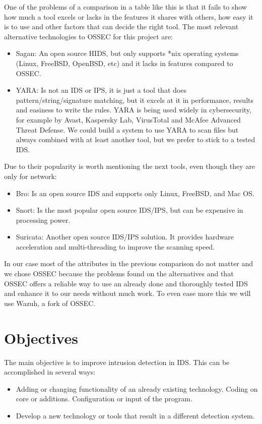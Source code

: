 \linej
\linej
One of the problems of a comparison in a table like this is that it fails to show how much a tool excels or lacks in the features it shares with others, how easy it is to use and other factors that can decide the right tool. The most relevant alternative technologies to OSSEC for this project are\cite{comparison_tools}:
\begin{itemize}
	\item Sagan: An open source HIDS, but only supports *nix operating systems (Linux, FreeBSD, OpenBSD, etc) and it lacks in features compared to OSSEC.
	\item YARA: Is not an IDS or IPS, it is just a tool that does pattern/string/signature matching, but it excels at it in performance, results and easiness to write the rules. YARA is being used widely in cybersecurity, for example by Avast, Kaspersky Lab, VirusTotal and McAfee Advanced Threat Defense\cite{who_is_using_yara}. We could build a system to use YARA to scan files but always combined with at least another tool, but we prefer to stick to a tested IDS.
\end{itemize}
\linej
Due to their popularity is worth mentioning the next tools, even though they are only for network:
\begin{itemize}
	\item Bro: Is an open source IDS and supports only Linux, FreeBSD, and Mac OS.
	\item Snort: Is the most popular open source IDS/IPS, but can be expensive in processing power.
	\item Suricata: Another open source IDS/IPS solution. It provides hardware acceleration and multi-threading to improve the scanning speed.
\end{itemize}
\linej
In our case most of the attributes in the previous comparison do not matter and we chose OSSEC because the problems found on the alternatives and that OSSEC offers a reliable way to use an already done and thoroughly tested IDS and enhance it to our needs without much work. To even ease more this we will use Wazuh, a fork of OSSEC.





\section{Objectives}
The main objective is to improve intrusion detection in IDS. This can be accomplished in several ways:
\begin{itemize}
	\item Adding or changing functionality of an already existing technology.
		\subitem Coding on core or additions.
		\subitem Configuration or input of the program.
	\item Develop a new technology or tools that result in a different detection system.
\end{itemize}

